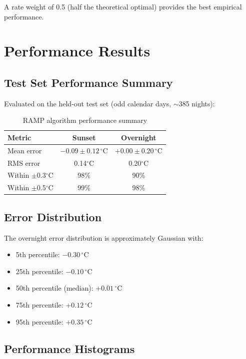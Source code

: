 \documentclass[11pt,letterpaper]{article}
\begin{document}
A rate weight of 0.5 (half the theoretical optimal) provides the best empirical performance.

\section{Performance Results}

\subsection{Test Set Performance Summary}

Evaluated on the held-out test set (odd calendar days, $\sim$385 nights):

\begin{table}[H]
\centering
\caption{RAMP algorithm performance summary}
\begin{tabular}{lcc}
\toprule
\textbf{Metric} & \textbf{Sunset} & \textbf{Overnight} \\
\midrule
Mean error & $-0.09 \pm 0.12\,^\circ$C & $+0.00 \pm 0.20\,^\circ$C \\
RMS error & 0.14$^\circ$C & 0.20$^\circ$C \\
Within $\pm$0.3$^\circ$C & 98\% & 90\% \\
Within $\pm$0.5$^\circ$C & 99\% & 98\% \\
\bottomrule
\end{tabular}
\end{table}

\subsection{Error Distribution}

The overnight error distribution is approximately Gaussian with:
\begin{itemize}[noitemsep]
    \item 5th percentile: $-0.30\,^\circ$C
    \item 25th percentile: $-0.10\,^\circ$C
    \item 50th percentile (median): $+0.01\,^\circ$C
    \item 75th percentile: $+0.12\,^\circ$C
    \item 95th percentile: $+0.35\,^\circ$C
\end{itemize}

\subsection{Performance Histograms}
\end{document}
